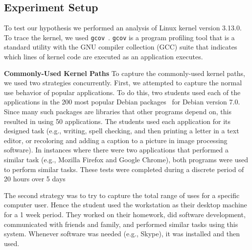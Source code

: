 \subsection{Experiment Setup}

To test our hypothesis we performed an analysis of Linux kernel version 3.13.0.
To trace the kernel, we used \texttt{gcov}~\cite{gcov}.  
\texttt{gcov} is a program profiling
tool that is a standard utility with the GNU compiler collection
(GCC) suite that indicates which lines of kernel code are executed as an
application executes.

\textbf{Commonly-Used Kernel Paths}
To capture the commonly-used kernel paths, we used two strategies concurrently.
First, we attempted to capture the normal use behavior of popular applications.
To do this, two students used each of the 
applications in the 200 most popular Debian packages~\cite{Top-Packages} for 
Debian version 7.0. 
Since many such packages are libraries that other programs
depend on, this resulted in using 50   applications.
The students used each application for its designed
task (e.g., writing, spell checking, and then printing a letter in a text
editor, or recoloring and adding a caption to a picture in image processing 
software).  In instances where there were two applications that performed a 
similar task (e.g., Mozilla Firefox and Google Chrome), both programs were
used to perform similar tasks.  These tests were completed during a discrete 
period of 20 hours over 5 days  

The second strategy was to try to capture the total range of uses for a 
specific computer user.  Hence the student used the workstation as their
desktop machine for a 1 week period.  They worked on their homework, did
software development, communicated with friends and family, and performed
similar tasks using this system.  Whenever software was needed (e.g., Skype),
it was installed and then used. 

